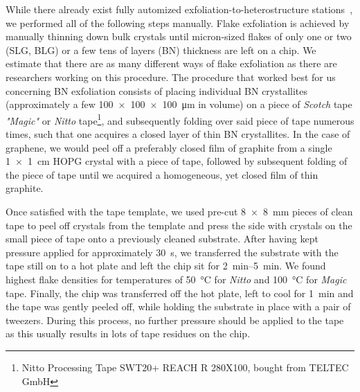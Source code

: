 While there already exist fully automized exfoliation-to-heterostructure stations~\cite{masubuchiAutonomousRoboticSearching2018a}, we performed all of the following steps manually.
%
Flake exfoliation is achieved by manually thinning down bulk crystals until micron-sized flakes of only one or two (SLG, BLG) or a few tens of layers (BN) thickness are left on a chip.
% 
We estimate that there are as many different ways of flake exfoliation as there are researchers working on this procedure.
% 
The procedure that worked best for us concerning BN exfoliation consists of placing individual BN crystallites (approximately a few \SI{100x100x100}{\micro\meter} in volume) on a piece of \textit{Scotch} tape \textit{"Magic"} or \textit{Nitto} tape\footnote{Nitto Processing Tape SWT20+ REACH R 280X100, bought from TELTEC GmbH}, and subsequently folding over said piece of tape numerous times, such that one acquires a closed layer of thin BN crystallites.
% 
In the case of graphene, we would peel off a preferably closed film of graphite from a single \SI{1x1}{\centi\meter} HOPG crystal with a piece of tape, followed by subsequent folding of the piece of tape until we acquired a homogeneous, yet closed film of thin graphite.


Once satisfied with the tape template, we used pre-cut \SI{8x8}{\milli\meter} pieces of clean tape to peel off crystals from the template and press the side with crystals on the small piece of tape onto a previously cleaned substrate.
%
After having kept pressure applied for approximately \SI{30}{\second}, we transferred the substrate with the tape still on to a hot plate and left the chip sit for \SIrange{2}{5}{\minute}.
% 
We found highest flake densities for temperatures of \SI{50}{\celsius} for \textit{Nitto} and \SI{100}{\celsius} for \textit{Magic} tape.
% 
Finally, the chip was transferred off the hot plate, left to cool for \SI{1}{\minute} and the tape was gently peeled off, while holding the substrate in place with a pair of tweezers.
% 
During this process, no further pressure should be applied to the tape as this usually results in lots of tape residues on the chip.


